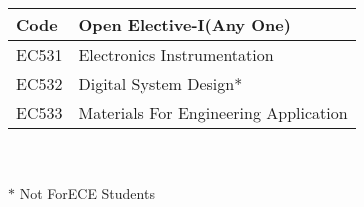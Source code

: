 \documentclass{article}
\begin{document}
\begin{table}[h!]
\begin{tabular}{|c|p{}|c|p{}|}
        \end{tabular}
        \\
        \\
        \\
        \begin{tabular}{|l |p{}|}
            \hline
            \textbf{Code} & \textbf{Open Elective-I(Any One)} \\ \hline
            EC531 & Electronics Instrumentation \\ \hline
            EC532 & Digital System Design* \\ \hline
            EC533 & Materials For Engineering Application \\ \hline
        \end{tabular}\\
        \\
         $*$ Not ForECE Students
    \end{table}
\end{document}
